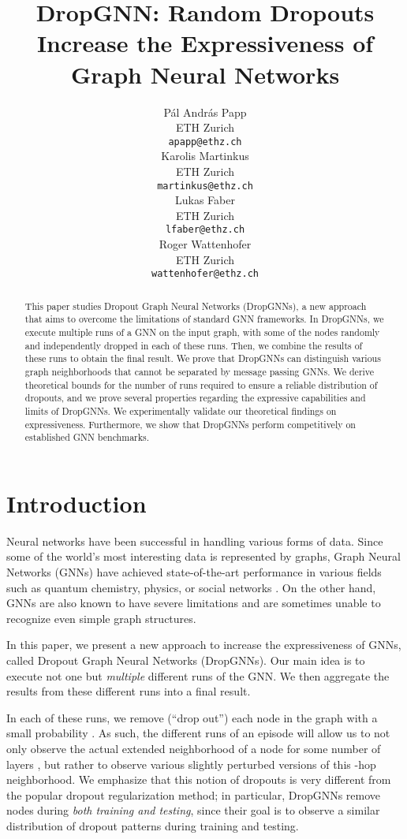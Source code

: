 \documentclass{article}
\title{DropGNN: Random Dropouts Increase the Expressiveness of Graph Neural Networks}
\author{
  Pál András Papp \\
  ETH Zurich \\
  \texttt{apapp@ethz.ch} \\
  \And
  Karolis Martinkus \\
  ETH Zurich \\
  \texttt{martinkus@ethz.ch} \\
  \And
  Lukas Faber \\
  ETH Zurich \\
  \texttt{lfaber@ethz.ch} \\
  \And
  Roger Wattenhofer \\
  ETH Zurich \\
  \texttt{wattenhofer@ethz.ch} \\
}
\begin{document}
\maketitle

\begin{abstract}
This paper studies Dropout Graph Neural Networks (DropGNNs), a new approach that aims to overcome the limitations of standard GNN frameworks. In DropGNNs, we execute multiple runs of a GNN on the input graph, with some of the nodes randomly and independently dropped in each of these runs. Then, we combine the results of these runs to obtain the final result. We prove that DropGNNs can distinguish various graph neighborhoods that cannot be separated by message passing GNNs. We derive theoretical bounds for the number of runs required to ensure a reliable distribution of dropouts, and we prove several properties regarding the expressive capabilities and limits of DropGNNs. We experimentally validate our theoretical findings on expressiveness. Furthermore, we show that DropGNNs perform competitively on established GNN benchmarks.
\end{abstract}

\section{Introduction}

Neural networks have been successful in handling various forms of data. Since some of the world's most interesting data is represented by graphs, Graph Neural Networks (GNNs) have achieved state-of-the-art performance in various fields such as quantum chemistry, physics, or social networks \citep{gilmer2017neural, sanchez2020learning,  kipf2017semisupervised}. On the other hand, GNNs are also known to have severe limitations and are sometimes unable to recognize even simple graph structures.


In this paper, we present a new approach to increase the expressiveness of GNNs, called Dropout Graph Neural Networks (DropGNNs). Our main idea is to execute not one but \textit{multiple} different runs of the GNN. We then aggregate the results from these different runs into a final result.

In each of these runs, we remove (``drop out'') each node in the graph with a small probability . As such, the different runs of an episode will allow us to not only observe the actual extended neighborhood of a node for some number of layers , but rather to observe various slightly perturbed versions of this -hop neighborhood. We emphasize that this notion of dropouts is very different from the popular dropout regularization method; in particular, DropGNNs remove nodes during \emph{both training and testing}, since their goal is to observe a similar distribution of dropout patterns during training and testing.
\end{document}
